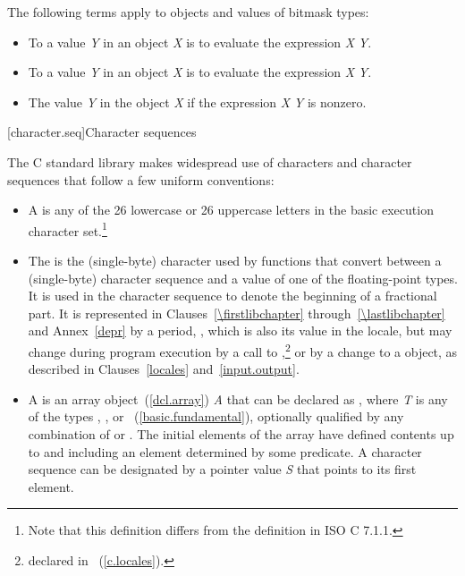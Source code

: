 \pnum
The following terms apply to objects and values of
bitmask types:

\begin{itemize}
\item
To
a value \textit{Y} in an object \textit{X}
is to evaluate the expression \textit{X} \tcode{|=} \textit{Y}.
\item
To
a value \textit{Y} in an object
\textit{X} is to evaluate the expression \textit{X} \tcode{\&= \~}\textit{Y}.
\item
The value \textit{Y}
in the object
\textit{X} if the expression \textit{X} \tcode{\&} \textit{Y} is nonzero.
\end{itemize}

[character.seq]{Character sequences}

\pnum
The C standard library makes widespread use
%
of characters and character sequences that follow a few uniform conventions:

\begin{itemize}
\item
A
is any of the 26 lowercase or 26
%
%
uppercase letters in the basic execution character set.\footnote{Note that
this definition differs from the definition in ISO C 7.1.1.}
\item
The
is the
%
(single-byte) character used by functions that convert between a (single-byte)
character sequence and a value of one of the floating-point types.
It is used
in the character sequence to denote the beginning of a fractional part.
It is
represented in Clauses~\ref{\firstlibchapter} through~\ref{\lastlibchapter}
and Annex~\ref{depr} by a period,
%
,
which is
also its value in the 
locale, but may change during program
execution by a call to
,\footnote{declared in
~(\ref{c.locales}).
%
%
%
}
or by a change to a
object, as described in Clauses~\ref{locales} and~\ref{input.output}.
\item
A
is an array object~(\ref{dcl.array}) \textit{A} that
can be declared as
,
where \textit{T} is any of the types
,
,
or
~(\ref{basic.fundamental}), optionally qualified by any combination of
or
.
The initial elements of the
array have defined contents up to and including an element determined by some
predicate.
A character sequence can be designated by a pointer value
\textit{S} that points to its first element.
\end{itemize}

